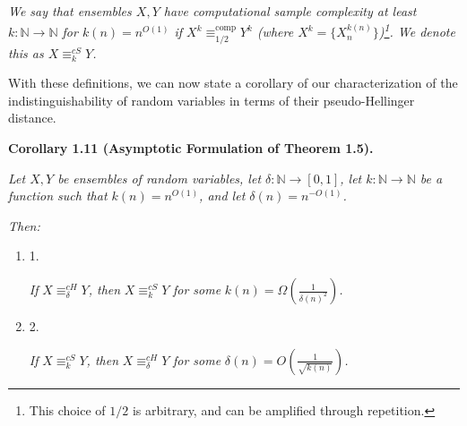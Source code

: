 \documentclass[10pt,a4paper]{article}
\begin{document}
\emph{We say that ensembles $X,Y$ have computational sample complexity at least $k:\mathbb{N}\rightarrow\mathbb{N}$ for $k(n)=n^{O(1)}$ if $X^{k}\equiv^{\mathrm{comp}}_{1/2}Y^{k}$ (where $X^{k}=\{X_{n}^{k(n)}\}$)\footnote{This choice of $1/2$ is arbitrary, and can be amplified through repetition.}. We denote this as $X\equiv_{k}^{cS}Y$.}\par






With these definitions, we can now state a corollary of our characterization of the indistinguishability of random variables in terms of their pseudo-Hellinger distance.\par





\par\medskip\noindent\textbf{
\textbf{Corollary 1.11}\textbf{ }(Asymptotic Formulation of Theorem 1.5)\textbf{.}
}\par



\emph{Let $X,Y$ be ensembles of random variables, let $\delta:\mathbb{N}\rightarrow[0,1]$, let $k:\mathbb{N}\rightarrow\mathbb{N}$ be a function such that $k(n)=n^{O(1)}$, and let $\delta(n)=n^{-O(1)}$.}\par




\emph{Then:}\par


\begin{enumerate}


\item[] 
1. 


\emph{If }$X\equiv_{\delta}^{cH}Y$\emph{, then }$X\equiv_{k}^{cS}Y$\emph{ for some }$k(n)=\Omega\left(\frac{1}{\delta(n)^{2}}\right)$\emph{.}\par





\item[] 
2. 


\emph{If }$X\equiv_{k}^{cS}Y$\emph{, then }$X\equiv^{cH}_{\delta}Y$\emph{ for some }$\delta(n)=O\left(\frac{1}{\sqrt{k(n)}}\right)$\emph{.}\par





\end{enumerate}
\end{document}
